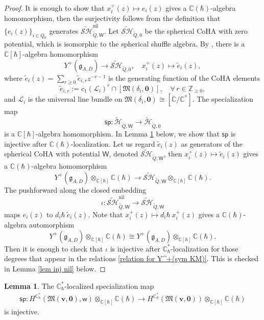 \documentclass[10pt]{amsart}
\theoremstyle{definition}
\newtheorem{Lemma}[Theorem]{Lemma}
\numberwithin{equation}{section}
\newcommand{\bC}{\mathbb{C}}
\newcommand{\bZ}{\mathbb{Z}}
\newcommand{\bv}{\mathbf{v}}
\newcommand{\fM}{\mathfrak{M}}
\newcommand{\sW}{\mathsf{W}}
\newcommand{\sw}{\mathsf{w}}
\begin{document}
\begin{proof}
It is enough to show that $x^+_i(z)\mapsto e_i(z)$ gives a $\bC(\hbar)$-algebra homomorphism, then the surjectivity follows from the definition that $\{e_i(z)\}_{i\in Q_0}$ generates $\widetilde{\mathcal{SH}}^{\mathrm{nil}}_{\widetilde{Q},\sW}$. Let $\widetilde{\mathcal{SH}}_{\widetilde{Q},0}$ be the spherical CoHA with zero potential, which is isomorphic to the spherical shuffle algebra. By \cite[Thm.~5.1]{YZ3}, there is a $\bC[\hbar]$-algebra homomorphism  
$$Y^+(\mathfrak{g}_{A,D})\to \widetilde{\mathcal{SH}}_{\widetilde{Q},0}, \quad x^+_i(z)\mapsto \tilde{e}_i(z), $$ 
where $\tilde{e}_i(z)=\sum_{r\geqslant 0}\tilde{e}_{i,r}z^{-r-1}$ is the generating function of the CoHA elements
$$\tilde{e}_{i,r}:=c_1(\mathcal L_{i})^{r}\cap\left[\fM(\delta_i,\mathbf 0)\right], \quad \forall \, r\in \bZ_{\geqslant 0},$$
and $\mathcal L_{i}$ is the universal line bundle on $\fM(\delta_i,\mathbf 0)\cong [\bC/\bC^*]$. The specialization map 
$$\mathsf{sp}\colon \widetilde{\mathcal{H}}_{\widetilde{Q},\sW}\to \widetilde{\mathcal{H}}_{\widetilde{Q},0}$$ 
is a $\bC[\hbar]$-algebra homomorphism. In Lemma \ref{lem sp inj for Y(sym KM)} below, we show that $\mathsf{sp}$ is injective after $\bC(\hbar)$-localization. Let us regard $\tilde{e}_i(z)$ as generators of the spherical CoHA with potential $\sW$, denoted $\widetilde{\mathcal{SH}}_{\widetilde{Q},\sW}$, then $x^+_i(z)\mapsto \tilde{e}_i(z)$ gives a $\bC(\hbar)$-algebra homomorphism  
$$Y^+(\mathfrak{g}_{A,D})\otimes_{\bC[\hbar]}\bC(\hbar)\to \widetilde{\mathcal{SH}}_{\widetilde{Q},\sW}\otimes_{\bC[\hbar]}\bC(\hbar).$$ 
The pushforward along the closed embedding 
$$\iota\colon \widetilde{\mathcal{SH}}^{\mathrm{nil}}_{\widetilde{Q},\sW}\to \widetilde{\mathcal{SH}}_{\widetilde{Q},\sW}$$ maps $e_i(z)$ to $d_i\hbar\: \tilde{e}_i(z)$. Note that $x^+_i(z)\mapsto d_i\hbar\:x^+_i(z)$ gives a $\bC(\hbar)$-algebra automorphism 
$$Y^+(\mathfrak{g}_{A,D})\otimes_{\bC[\hbar]}\bC(\hbar)\cong Y^+(\mathfrak{g}_{A,D})\otimes_{\bC[\hbar]}\bC(\hbar).$$ 
Then it is enough to check that $\iota$ is injective after $\bC^*_\hbar$-localization for those degrees that appear in the relations \eqref{relation for Y^+(sym KM)}. This is checked in Lemma \ref{lem inj nil} below.
\end{proof}

\begin{Lemma}\label{lem sp inj for Y(sym KM)}
The $\bC^*_\hbar$-localized specialization map
\begin{align*}
\mathsf{sp}\colon H^{\bC^*_\hbar}(\fM(\bv,\mathbf 0),\sw)\otimes_{\bC[\hbar]}\bC(\hbar)\to H^{\bC^*_\hbar}(\fM(\bv,\mathbf 0))\otimes_{\bC[\hbar]}\bC(\hbar)
\end{align*}
is injective.
\end{Lemma}
\end{document}
